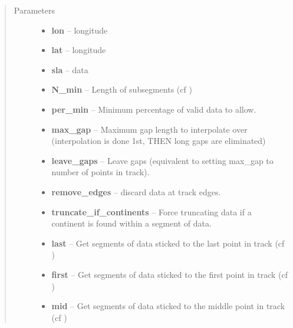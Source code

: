 \documentclass[letterpaper,10pt,english]{sphinxmanual}
\begin{document}
\begin{fulllineitems}
\begin{description}
\begin{itemize}
\end{itemize}

\end{description}
\begin{quote}\begin{description}
\item[{Parameters}] \leavevmode\begin{itemize}
\item {} 
\textbf{lon} -- longitude

\item {} 
\textbf{lat} -- longitude

\item {} 
\textbf{sla} -- data

\item {} 
\textbf{N\_min} -- Length of subsegments (cf )

\item {} 
\textbf{per\_min} -- Minimum percentage of valid data to allow.

\item {} 
\textbf{max\_gap} -- Maximum gap length to interpolate over (interpolation is done 1st, THEN long gaps are eliminated)

\item {} 
\textbf{leave\_gaps} -- Leave gaps (equivalent to setting max\_gap to number of points in track).

\item {} 
\textbf{remove\_edges} -- discard data at track edges.

\item {} 
\textbf{truncate\_if\_continents} -- Force truncating data if a continent is found within a segment of data.

\item {} 
\textbf{last} -- Get segments of data sticked to the last point in track (cf )

\item {} 
\textbf{first} -- Get segments of data sticked to the first point in track (cf )

\item {} 
\textbf{mid} -- Get segments of data sticked to the middle point in track (cf )

\end{itemize}

\end{description}\end{quote}

\end{fulllineitems}
\end{document}
